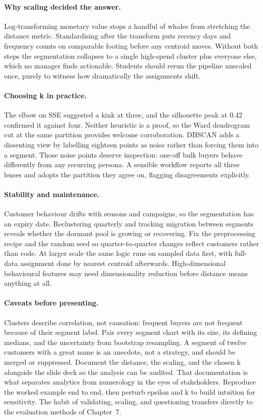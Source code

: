 \paragraph{Why scaling decided the answer.} Log-transforming monetary value stops a handful of whales from stretching the distance metric.
Standardising after the transform puts recency days and frequency counts on comparable footing before any centroid moves.
Without both steps the segmentation collapses to a single high-spend cluster plus everyone else, which no manager finds actionable.
Students should rerun the pipeline unscaled once, purely to witness how dramatically the assignments shift.
\paragraph{Choosing k in practice.} The elbow on SSE suggested a kink at three, and the silhouette peak at 0.42 confirmed it against four.
Neither heuristic is a proof, so the Ward dendrogram cut at the same partition provides welcome corroboration.
DBSCAN adds a dissenting view by labelling eighteen points as noise rather than forcing them into a segment.
Those noise points deserve inspection: one-off bulk buyers behave differently from any recurring persona.
A sensible workflow reports all three lenses and adopts the partition they agree on, flagging disagreements explicitly.
\paragraph{Stability and maintenance.} Customer behaviour drifts with seasons and campaigns, so the segmentation has an expiry date.
Reclustering quarterly and tracking migration between segments reveals whether the dormant pool is growing or recovering.
Fix the preprocessing recipe and the random seed so quarter-to-quarter changes reflect customers rather than code.
At larger scale the same logic runs on sampled data first, with full-data assignment done by nearest centroid afterwards.
High-dimensional behavioural features may need dimensionality reduction before distance means anything at all.
\paragraph{Caveats before presenting.} Clusters describe correlation, not causation: frequent buyers are not frequent because of their segment label.
Pair every segment chart with its size, its defining medians, and the uncertainty from bootstrap resampling.
A segment of twelve customers with a great name is an anecdote, not a strategy, and should be merged or suppressed.
Document the distance, the scaling, and the chosen k alongside the slide deck so the analysis can be audited.
That documentation is what separates analytics from numerology in the eyes of stakeholders.
Reproduce the worked example end to end, then perturb epsilon and k to build intuition for sensitivity.
The habit of validating, scaling, and questioning transfers directly to the evaluation methods of Chapter~7.

